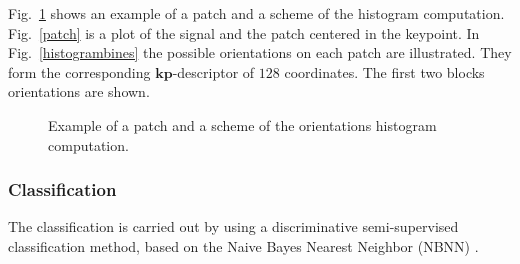 \documentclass[entropy,article,submit,moreauthors,pdftex,10pt,a4paper]{mdpi}
\begin{document}
Fig.~\ref{fig:sampledescriptor} shows an example of a patch and a scheme of the histogram computation. Fig.~\ref{patch} is a plot of the signal and the patch centered in the keypoint. In Fig.~\ref{histogrambines} the possible orientations on each patch are illustrated. They form the corresponding $\mathbf{kp}$-descriptor of $128$ coordinates. The first two blocks orientations are shown. 
 

 
\begin{figure}[H]
\centering
{}
\caption{ Example of a patch and a scheme of the orientations histogram computation.}
\label{fig:sampledescriptor}
\end{figure}

\subsubsection{Classification} \label{Classification}

The classification is carried out by using a discriminative semi-supervised classification method, based on the Naive Bayes Nearest Neighbor (NBNN) \citep{Boiman2008}.

\end{document}
